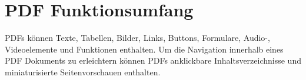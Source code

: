 \section{PDF Funktionsumfang}
PDFs können Texte, Tabellen, Bilder, Links, Buttons, Formulare, Audio-, Videoelemente und Funktionen enthalten.
Um die Navigation innerhalb eines PDF Dokuments zu erleichtern können PDFs anklickbare Inhaltsverzeichnisse und miniaturisierte Seitenvorschauen enthalten.